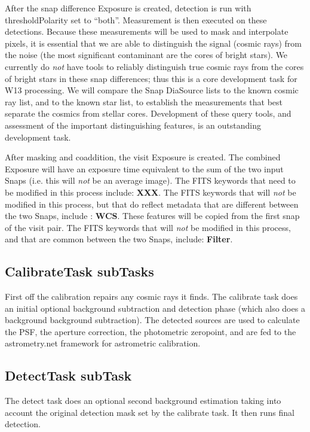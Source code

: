\documentclass[12pt]{article}
\begin{document}
After the snap difference Exposure is created, detection is run with
thresholdPolarity set to ``both''.  Measurement is then executed on
these detections.  Because these measurements will be used to mask and
interpolate pixels, it is essential that we are able to distinguish
the signal (cosmic rays) from the noise (the most significant
contaminant are the cores of bright stars).  We currently do {\it not}
have tools to reliably distinguish true cosmic rays from the cores of
bright stars in these snap differences; thus this is a core
development task for W13 processing.  We will compare the Snap
DiaSource lists to the known cosmic ray list, and to the known star
list, to establish the measurements that best separate the cosmics
from stellar cores.  Development of these query tools, and assessment
of the important distinguishing features, is an outstanding
development task.

After masking and coaddition, the visit Exposure is created.  The
combined Exposure will have an exposure time equivalent to the sum of
the two input Snaps (i.e. this will {\it not} be an average image).
The FITS keywords that need to be modified in this process include:
{\bf XXX}.  The FITS keywords that will {\it not} be modified in this
process, but that do reflect metadata that are different between the
two Snaps, include : {\bf WCS}.  These features will be copied from
the first snap of the visit pair.  The FITS keywords that will {\it
  not} be modified in this process, and that are common between the
two Snaps, include: {\bf Filter}.

\subsection{CalibrateTask subTasks} 
First off the calibration repairs any cosmic rays it finds.
The calibrate task does an initial optional background subtraction and detection phase (which also does a background background subtraction).  The detected sources are used to calculate
the PSF, the aperture correction, the photometric zeropoint, and are fed to the astrometry.net framework for astrometric
calibration.

\subsection{DetectTask subTask}
The detect task does an optional second background estimation taking into account the original detection mask set by the calibrate task.
It then runs final detection.
\end{document}
